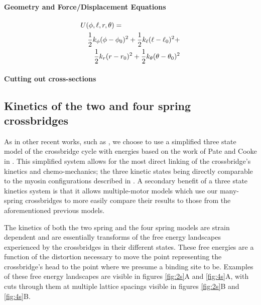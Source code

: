 \documentclass[]{article}
\begin{document}
\paragraph*{Geometry and Force/Displacement Equations}



\begin{eqnarray}
	\lefteqn{U(\phi,\ell,r,\theta) = }  \nonumber \\
 	& & \frac{1}{2}k_\phi (\phi-\phi_0)^2 + \frac{1}{2}k_\ell (\ell-\ell_0)^2 + \nonumber \\
	& & \frac{1}{2}k_r (r-r_0)^2 + \frac{1}{2}k_\theta (\theta-\theta_0)^2
\end{eqnarray}


\paragraph*{Cutting out cross-sections}




\subsection*{Kinetics of the two and four spring crossbridges}

As in other recent works, such as \citet{Tanner:2007:pe115}, we choose to use a simplified three state model of the crossbridge cycle with energies based on the work of Pate and Cooke in \citet{Pate1988}. 
This simplified system allows for the most direct linking of the crossbridge's kinetics and chemo-mechanics; the three kinetic states being directly comparable to the myosin configurations described in \citet{Houdusse:2000:p11238}.
A secondary benefit of a three state kinetics system is that it allows multiple-motor models which use our many-spring crossbridges to more easily compare their results to those from the aforementioned previous models.

The kinetics of both the two spring and the four spring models are strain dependent and are essentially transforms of the free energy landscapes experienced by the crossbridges in their different states.
These free energies are a function of the distortion necessary to move the point representing the crossbridge's head to the point where we presume a binding site to be.
Examples of these free energy landscapes are visible in figures \ref{fig:2s}A and \ref{fig:4s}A, with cuts through them at multiple lattice spacings visible in figures \ref{fig:2s}B and \ref{fig:4s}B.
\end{document}

